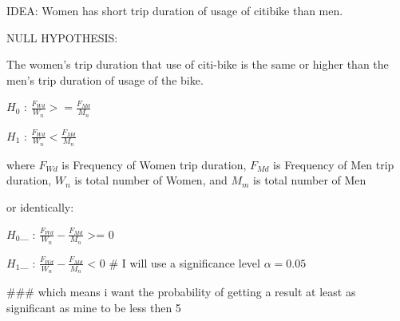 IDEA:
Women has short trip duration of usage of citibike than men.

NULL HYPOTHESIS:

The women's trip duration that use of citi-bike is the same or higher than the men's trip duration of usage of the bike.

$H_0$ : $\frac{F_{Wd}}{W_{n}} >= \frac{F_{Md}}{M_{n}} $ 

$H_1$ : $\frac{F_{Wd}}{W_{n}} < \frac{F_{Md}}{M_{n}} $

where $F_{Wd}$ is Frequency of Women trip duration, $F_{Md}$ is Frequency of Men trip duration, ${W_{n}}$ is total number of Women, and ${M_{m}}$ is total number of Men

or identically:

$H_0$_ : $\frac{F_{Wd}}{W_{n}} - \frac{F_{Md}}{M_{n}} $ >= 0

$H_1$_ : $\frac{F_{Wd}}{W_{n}} - \frac{F_{Md}}{M_{n}} $ < 0
# I will use a significance level  $\alpha=0.05$

### which means i want the probability of getting a result at least as significant as mine to be less then 5%